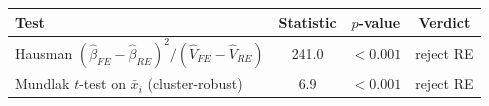 \begin{tabular}{lccc}\toprule
Test & Statistic & $p$-value & Verdict \\ \midrule
Hausman $(\hat\beta_{FE}-\hat\beta_{RE})^2 / (\hat V_{FE}-\hat V_{RE})$ & 241.0 & $<0.001$ & reject RE \\
Mundlak $t$-test on $\bar x_i$ (cluster-robust) & 6.9 & $<0.001$ & reject RE \\
\bottomrule\end{tabular}
